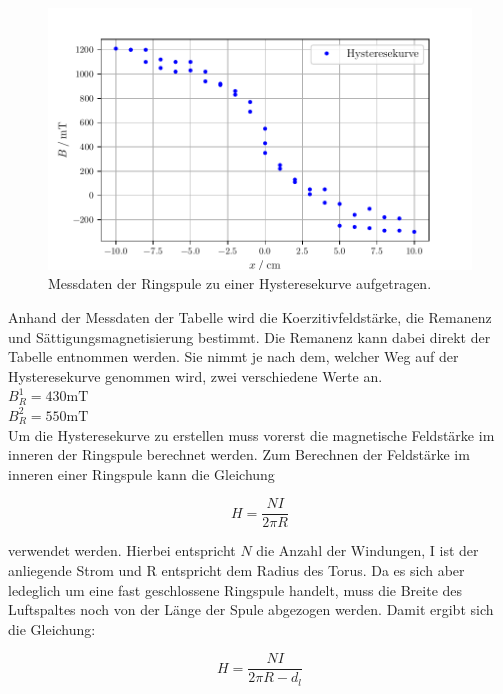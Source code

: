 \begin{figure}
  \centering
  \includegraphics[width=\textwidth]{build/Hysteresekurve.pdf}
  \caption{Messdaten der Ringspule zu einer Hysteresekurve aufgetragen.}\label{fig:hysterese}
\end{figure}

Anhand der Messdaten der Tabelle wird die Koerzitivfeldstärke, die Remanenz
und Sättigungsmagnetisierung bestimmt.
Die Remanenz kann dabei direkt der Tabelle entnommen werden. Sie nimmt je nach dem, welcher Weg 
auf der Hysteresekurve genommen wird, zwei verschiedene Werte an.\\

\quad $B_{R}^1=430 \si{\milli\tesla}$\\
\quad $B_{R}^2=550 \si{\milli\tesla}$\\

Um die Hysteresekurve zu erstellen muss vorerst die magnetische Feldstärke im inneren der Ringspule berechnet werden.
Zum Berechnen der Feldstärke im inneren einer Ringspule kann die Gleichung 

\begin{equation}
H=\frac{NI}{2\pi R}
\end{equation}

verwendet werden. Hierbei entspricht $N$ die Anzahl der Windungen, I ist der anliegende Strom und 
R entspricht dem Radius des Torus. Da es sich aber ledeglich um eine fast geschlossene Ringspule handelt, muss die Breite des Luftspaltes
noch von der Länge der Spule abgezogen werden. Damit ergibt sich die Gleichung:

\begin{equation}
H=\frac{NI}{2\pi R-d_l}
\end{equation}

